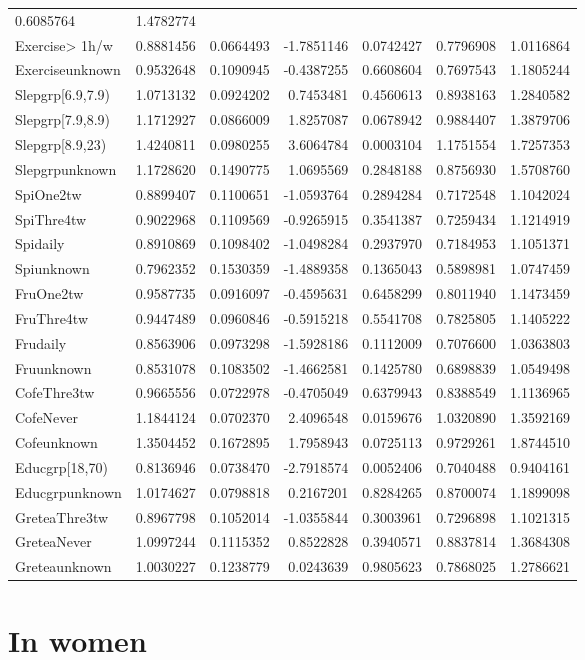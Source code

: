\documentclass[]{article}
\begin{document}
\begin{longtable}[]{@{}lrrrrrr@{}}
0.6085764 & 1.4782774\tabularnewline
Exercise\textgreater{} 1h/w & 0.8881456 & 0.0664493 & -1.7851146 &
0.0742427 & 0.7796908 & 1.0116864\tabularnewline
Exerciseunknown & 0.9532648 & 0.1090945 & -0.4387255 & 0.6608604 &
0.7697543 & 1.1805244\tabularnewline
Slepgrp{[}6.9,7.9) & 1.0713132 & 0.0924202 & 0.7453481 & 0.4560613 &
0.8938163 & 1.2840582\tabularnewline
Slepgrp{[}7.9,8.9) & 1.1712927 & 0.0866009 & 1.8257087 & 0.0678942 &
0.9884407 & 1.3879706\tabularnewline
Slepgrp{[}8.9,23) & 1.4240811 & 0.0980255 & 3.6064784 & 0.0003104 &
1.1751554 & 1.7257353\tabularnewline
Slepgrpunknown & 1.1728620 & 0.1490775 & 1.0695569 & 0.2848188 &
0.8756930 & 1.5708760\tabularnewline
SpiOne2tw & 0.8899407 & 0.1100651 & -1.0593764 & 0.2894284 & 0.7172548 &
1.1042024\tabularnewline
SpiThre4tw & 0.9022968 & 0.1109569 & -0.9265915 & 0.3541387 & 0.7259434
& 1.1214919\tabularnewline
Spidaily & 0.8910869 & 0.1098402 & -1.0498284 & 0.2937970 & 0.7184953 &
1.1051371\tabularnewline
Spiunknown & 0.7962352 & 0.1530359 & -1.4889358 & 0.1365043 & 0.5898981
& 1.0747459\tabularnewline
FruOne2tw & 0.9587735 & 0.0916097 & -0.4595631 & 0.6458299 & 0.8011940 &
1.1473459\tabularnewline
FruThre4tw & 0.9447489 & 0.0960846 & -0.5915218 & 0.5541708 & 0.7825805
& 1.1405222\tabularnewline
Frudaily & 0.8563906 & 0.0973298 & -1.5928186 & 0.1112009 & 0.7076600 &
1.0363803\tabularnewline
Fruunknown & 0.8531078 & 0.1083502 & -1.4662581 & 0.1425780 & 0.6898839
& 1.0549498\tabularnewline
CofeThre3tw & 0.9665556 & 0.0722978 & -0.4705049 & 0.6379943 & 0.8388549
& 1.1136965\tabularnewline
CofeNever & 1.1844124 & 0.0702370 & 2.4096548 & 0.0159676 & 1.0320890 &
1.3592169\tabularnewline
Cofeunknown & 1.3504452 & 0.1672895 & 1.7958943 & 0.0725113 & 0.9729261
& 1.8744510\tabularnewline
Educgrp{[}18,70) & 0.8136946 & 0.0738470 & -2.7918574 & 0.0052406 &
0.7040488 & 0.9404161\tabularnewline
Educgrpunknown & 1.0174627 & 0.0798818 & 0.2167201 & 0.8284265 &
0.8700074 & 1.1899098\tabularnewline
GreteaThre3tw & 0.8967798 & 0.1052014 & -1.0355844 & 0.3003961 &
0.7296898 & 1.1021315\tabularnewline
GreteaNever & 1.0997244 & 0.1115352 & 0.8522828 & 0.3940571 & 0.8837814
& 1.3684308\tabularnewline
Greteaunknown & 1.0030227 & 0.1238779 & 0.0243639 & 0.9805623 &
0.7868025 & 1.2786621\tabularnewline
\bottomrule
\end{longtable}

\hypertarget{in-women}{%
\section{In women}\label{in-women}}
\end{document}
